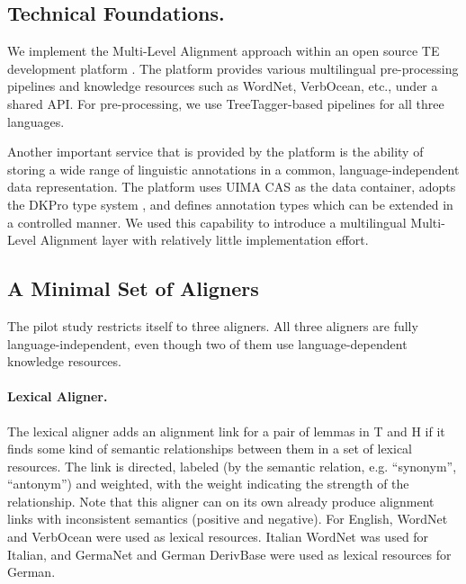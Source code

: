\documentclass[11pt,letterpaper]{article}
\begin{document}

\subsection{Technical Foundations.}  
\label{sec:techn-found}

We implement the Multi-Level Alignment approach within an open source
TE development platform \cite{EOP-arch}. The platform provides various
multilingual pre-processing pipelines and knowledge resources such as
WordNet, VerbOcean, etc., under a shared API. For pre-processing, we
use TreeTagger-based pipelines for all three languages.

Another important service that is provided by the platform is the
ability of storing a wide range of linguistic annotations in a common,
language-independent data representation. The platform uses UIMA CAS
\cite{d04:_uima} as the data container, adopts the DKPro type system
\cite{DKpro}, and defines annotation types which can be extended in a
controlled manner. We used this capability to introduce a multilingual
Multi-Level Alignment layer %
with relatively little implementation effort.

\subsection{A Minimal Set of Aligners}

The pilot study restricts itself to three aligners.  
All three aligners are fully language-independent, even though two of
them use language-dependent knowledge resources. 

\paragraph{Lexical Aligner.} The lexical aligner adds an alignment link
for a pair of lemmas in T and H if it finds some kind of semantic
relationships between them in a set of lexical resources. The link is
directed, labeled (by the semantic relation, e.g. ``synonym'',
``antonym'') and weighted, with the weight indicating the strength of
the relationship. Note that this aligner can on its own already
produce alignment links with inconsistent semantics (positive and
negative). For English, WordNet and VerbOcean were used as lexical
resources. Italian WordNet was used for Italian, and GermaNet and
German DerivBase \cite{Zeller:2013} were used as lexical resources for
German.
\end{document}
